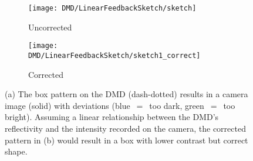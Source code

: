 \begin{figure}[tbp]
    \centering
    \begin{subfigure}[T]{0.06\textwidth}
    \end{subfigure}
    \begin{subfigure}[T]{0.42\textwidth}
        \centering
        \texttt{[image: DMD/LinearFeedbackSketch/sketch]}
        \caption{Uncorrected}
    \end{subfigure}
    \begin{subfigure}[T]{0.42\textwidth}
        \centering
        \texttt{[image: DMD/LinearFeedbackSketch/sketch1\_correct]}
        \caption{Corrected}
    \end{subfigure}
    \caption[Basic example of linear feedback]{(a) The box pattern on the DMD (dash-dotted) results in a camera image (solid) with deviations (blue~$=$~too dark, green~$=$~too bright). Assuming a linear relationship between the DMD's reflectivity and the intensity recorded on the camera, the corrected pattern in (b) would result in a box with lower contrast but correct shape.}
    \label{fig:linear_feedback_scheme}
\end{figure}


